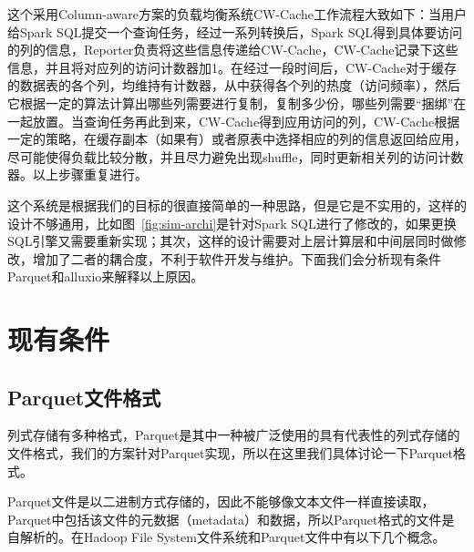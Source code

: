 \par 这个采用Column-aware方案的负载均衡系统CW-Cache工作流程大致如下：当用户给Spark SQL提交一个查询任务，经过一系列转换后，Spark SQL得到具体要访问的列的信息，Reporter负责将这些信息传递给CW-Cache，CW-Cache记录下这些信息，并且将对应列的访问计数器加1。在经过一段时间后，CW-Cache对于缓存的数据表的各个列，均维持有计数器，从中获得各个列的热度（访问频率），然后它根据一定的算法计算出哪些列需要进行复制，复制多少份，哪些列需要“捆绑”在一起放置。当查询任务再此到来，CW-Cache得到应用访问的列，CW-Cache根据一定的策略，在缓存副本（如果有）或者原表中选择相应的列的信息返回给应用，尽可能使得负载比较分散，并且尽力避免出现shuffle，同时更新相关列的访问计数器。以上步骤重复进行。

\par 这个系统是根据我们的目标的很直接简单的一种思路，但是它是不实用的，这样的设计不够通用，比如图~\ref{fig:sim-archi}是针对Spark SQL进行了修改的，如果更换SQL引擎又需要重新实现；其次，这样的设计需要对上层计算层和中间层同时做修改，增加了二者的耦合度，不利于软件开发与维护。下面我们会分析现有条件Parquet和alluxio来解释以上原因。

\section{现有条件}

\subsection{Parquet文件格式}

\par 列式存储有多种格式，Parquet是其中一种被广泛使用的具有代表性的列式存储的文件格式，我们的方案针对Parquet实现，所以在这里我们具体讨论一下Parquet格式。

\par Parquet文件是以二进制方式存储的，因此不能够像文本文件一样直接读取，Parquet中包括该文件的元数据（metadata）和数据，所以Parquet格式的文件是自解析的。在Hadoop File System文件系统和Parquet文件中有以下几个概念。

